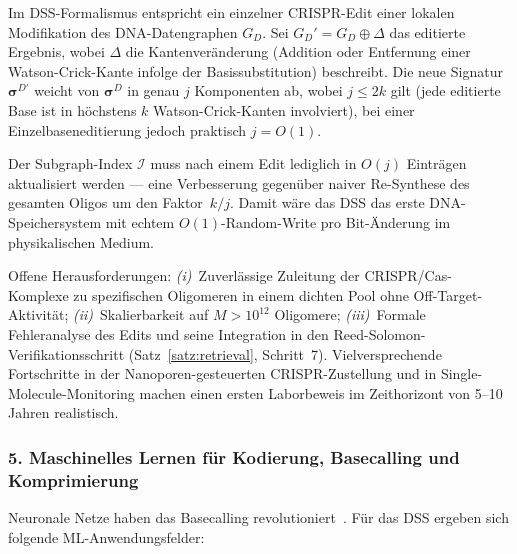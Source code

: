 ﻿\documentclass[a4paper,12pt]{article}
\theoremstyle{definition}
\begin{document}
Im DSS-Formalismus entspricht ein einzelner CRISPR-Edit einer lokalen
Modifikation des DNA-Datengraphen $G_D$.
Sei $G_D' = G_D \oplus \Delta$ das editierte Ergebnis, wobei
$\Delta$ die Kantenver\"{a}nderung (Addition oder Entfernung einer
Watson-Crick-Kante infolge der Basissubstitution) beschreibt.
Die neue Signatur $\boldsymbol{\sigma}^{D'}$ weicht von $\boldsymbol{\sigma}^D$
in genau $j$ Komponenten ab, wobei $j \le 2k$ gilt
(jede editierte Base ist in h\"{o}chstens $k$ Watson-Crick-Kanten involviert),
bei einer Einzelbaseneditierung jedoch praktisch $j = O(1)$.

Der Subgraph-Index $\mathcal{I}$ muss nach einem Edit lediglich in $O(j)$
Eintr\"{a}gen aktualisiert werden --- eine Verbesserung gegen\"{u}ber
naiver Re-Synthese des gesamten Oligos um den Faktor~$k/j$.
Damit w\"{a}re das DSS das erste DNA-Speichersystem mit echtem
$O(1)$-Random-Write pro Bit-\"{A}nderung im physikalischen Medium.

Offene Herausforderungen: \emph{(i)}~Zuverl\"{a}ssige Zuleitung der CRISPR/Cas-Komplexe
zu spezifischen Oligomeren in einem dichten Pool ohne Off-Target-Aktivit\"{a}t;
\emph{(ii)}~Skalierbarkeit auf $M > 10^{12}$ Oligomere;
\emph{(iii)}~Formale Fehleranalyse des Edits und seine Integration in den
Reed-Solomon-Verifikationsschritt (Satz~\ref{satz:retrieval}, Schritt~7).
Vielversprechende Fortschritte in der Nanoporen-gesteuerten CRISPR-Zustellung
und in Single-Molecule-Monitoring machen einen ersten Laborbeweis im
Zeithorizont von 5--10 Jahren realistisch.

\subsubsection*{5.\; Maschinelles Lernen f\"{u}r Kodierung, Basecalling und Komprimierung}

Neuronale Netze haben das Basecalling revolutioniert~\cite{deamer2016}.
F\"{u}r das DSS ergeben sich folgende ML-Anwendungsfelder:
\end{document}
